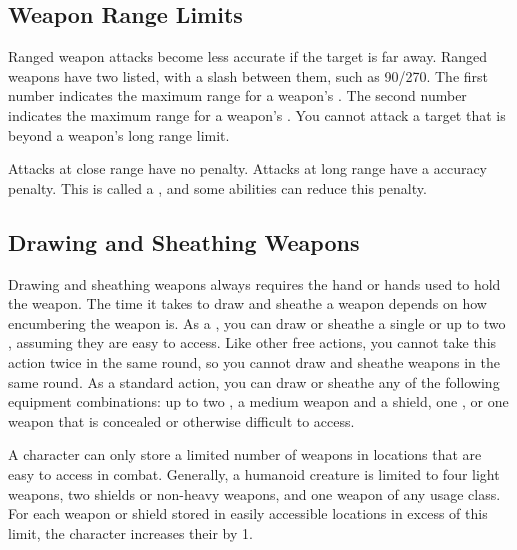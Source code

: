     \subsection{Weapon Range Limits}\label{Weapon Range Limits}
        Ranged weapon attacks become less accurate if the target is far away.
        Ranged weapons have two  listed, with a slash between them, such as 90/270.
        The first number indicates the maximum range for a weapon's .
        The second number indicates the maximum range for a weapon's .
        You cannot attack a target that is beyond a weapon's long range limit.

        Attacks at close range have no penalty.
        Attacks at long range have a  accuracy penalty.
        This is called a , and some abilities can reduce this penalty.

    \subsection{Drawing and Sheathing Weapons}\label{Drawing and Sheathing Weapons}
        Drawing and sheathing weapons always requires the hand or hands used to hold the weapon.
        The time it takes to draw and sheathe a weapon depends on how encumbering the weapon is.
        As a , you can draw or sheathe a single  or up to two , assuming they are easy to access.
        Like other free actions, you cannot take this action twice in the same round, so you cannot draw and sheathe weapons in the same round.
        As a standard action, you can draw or sheathe any of the following equipment combinations: up to two , a medium weapon and a shield, one , or one weapon that is concealed or otherwise difficult to access.

        A character can only store a limited number of weapons in locations that are easy to access in combat.
        Generally, a humanoid creature is limited to four light weapons, two shields or non-heavy weapons, and one weapon of any usage class.
        For each weapon or shield stored in easily accessible locations in excess of this limit, the character increases their  by 1.

